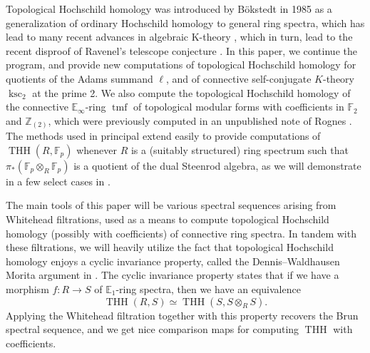 \documentclass[11pt,leqno]{article}
\newcommand{\zz}{\mathbb{Z}}
\newcommand{\bb}[1]{\mathbb{#1}}
\newcommand{\fff}{\mathbb{F}}
\DeclareMathOperator{\THH}{THH}
\DeclareMathOperator{\tmf}{tmf}
\DeclareMathOperator{\ksc}{ksc}
\newtheorem*{short hand}{theorem name}
\theoremstyle{plain}  %
\theoremstyle{definition}
\numberwithin{equation}{section}
\begin{document}
\indent\indent Topological Hochschild homology was introduced by B\"{o}kstedt in 1985 as a generalization of ordinary Hochschild homology to general ring spectra, which has lead to many recent advances in algebraic K-theory \cite{nikolaus2018topological}, which in turn, lead to the recent disproof of Ravenel's telescope conjecture \cite{burklund2023ktheoretic}.  In this paper, we continue the program, and provide new computations of topological Hochschild homology for quotients of the Adams summand $\ell$, and of connective self-conjugate $K$-theory $\ksc_2$ at the prime 2.  We also compute the topological Hochschild homology of the connective $\bb{E}_{\infty}$-ring $\tmf$ of topological modular forms \cite{goerss2009topologicalmodularformsaftern} with coefficients in $\fff_2$ and $\zz_{(2)}$, which were previously computed in an unpublished note of Rognes \cite{Rognes14tmf}.  The methods used in principal extend easily to provide computations of $\THH(R,\fff_p)$ whenever $R$ is a (suitably structured) ring spectrum such that $\pi_*(\fff_p\otimes_{R}\fff_p)$ is a quotient of the dual Steenrod algebra, as we will demonstrate in a few select cases in .

The main tools of this paper will be various spectral sequences arising from Whitehead filtrations, used as a means to compute topological Hochschild homology (possibly with coefficients) of connective ring spectra.  In tandem with these filtrations, we will heavily utilize the fact that topological Hochschild homology enjoys a cyclic invariance property, called the Dennis–Waldhausen Morita argument in \cite[~Proposition 6.2]{Blumberg_2012}.  The cyclic invariance property states that if we have a morphism $f:R\to S$ of $\bb{E}_1$-ring spectra, then we have an equivalence $$\THH(R,S)\simeq \THH(S,S\otimes_{R}S).$$  Applying the Whitehead filtration together with this property recovers the Brun spectral sequence, and we get nice comparison maps for computing $\THH$ with coefficients.
	
\end{document}
